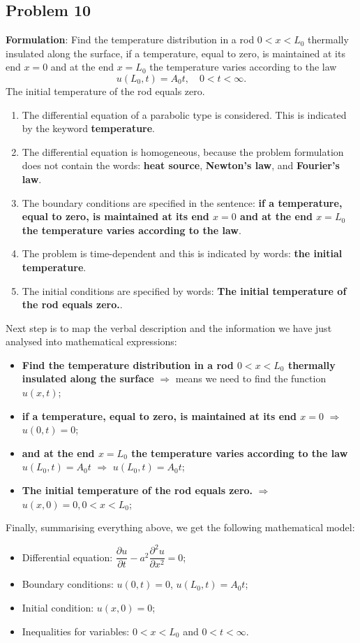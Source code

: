 \subsection{Problem 10}

{\bfseries Formulation}: Find the temperature distribution in a rod $0<x<L_{0}$ thermally insulated along the surface, if a temperature, equal to zero, is maintained at its end $x=0$ and at the end $x=L_{0}$ the temperature varies according to the law
\begin{equation*}
u(L_{0},t)=A_{0}t, \quad 0<t<\infty.
\end{equation*}
The initial temperature of the rod equals zero.
\begin{enumerate}
\item The differential equation of a parabolic type is considered. This is indicated by the keyword {\bfseries temperature}.
\item The differential equation is homogeneous, because the problem formulation does not contain the words: {\bfseries heat source}, {\bfseries Newton's law}, and {\bfseries Fourier's law}.
\item The boundary conditions are specified in the sentence: {\bfseries if a temperature, equal to zero, is maintained at its end $x=0$ and at the end $x=L_{0}$ the temperature varies according to the law}.
\item The problem is time-dependent and this is indicated by words: {\bfseries the initial temperature}.
\item The initial conditions are specified by words: {\bfseries The initial temperature of the rod equals zero.}.
\end{enumerate}
Next step is to map the verbal description and the information we have just analysed into mathematical expressions:
\begin{itemize}
\item {\bfseries Find the temperature distribution in a rod $0<x<L_{0}$ thermally insulated along the surface} $\Longrightarrow$ means we need to find the function $u(x,t)$;
\item {\bfseries  if a temperature, equal to zero, is maintained at its end $x=0$} $\Longrightarrow$ $u(0,t)=0$;
\item {\bfseries  and at the end $x=L_{0}$ the temperature varies according to the law $u(L_{0},t)=A_{0}t$} $\Longrightarrow$ $u(L_{0},t)=A_{0}t$;
\item {\bfseries The initial temperature of the rod equals zero.} $\Longrightarrow$ $u(x,0)=0, 0<x<L_{0}$;
\end{itemize}
Finally, summarising everything above, we get the following mathematical model:
\begin{itemize}
\item Differential equation: $\dfrac{\partial u}{\partial t} - a^{2}\dfrac{\partial^{2} u}{\partial x^{2}}=0$;
\item Boundary conditions: $u(0,t)=0$, $u(L_{0},t)=A_{0}t$;
\item Initial condition: $u(x,0)=0$;
\item Inequalities for variables: $0<x<L_{0}$ and $0<t<\infty$.
\end{itemize}